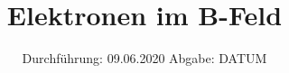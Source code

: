 

\subject{502}
\title{Elektronen im B-Feld}
\date{%
  Durchführung: 09.06.2020
  \hspace{3em}
  Abgabe: DATUM
}



\maketitle
\thispagestyle{empty}
\tableofcontents
\newpage






\nocite{V502}

\printbibliography{}


